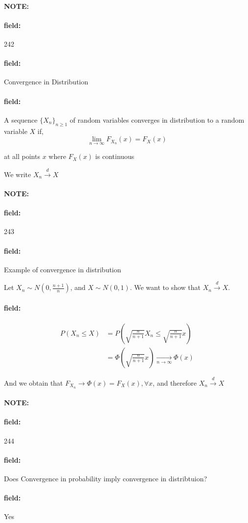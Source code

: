 \documentclass[12pt]{article}
\newenvironment{note}{\paragraph{NOTE:}}{}
\newenvironment{field}{\paragraph{field:}}{}
\begin{document}
\begin{note} \begin{field} \tiny 242 \end{field}
  \begin{field}
    Convergence in Distribution
  \end{field}
  \begin{field}
    A sequence $\{X_n\}_{n \geq 1}$ of random variables converges in distribution to a random variable $X$ if,
    $$ \lim_{n \to \infty} F_{X_n}(x) = F_X(x)$$

    at all points $x$ where $F_X(x)$ is continuous

    We write $X_n \overset{d}{\to} X$
  \end{field}
\end{note}

\begin{note} \begin{field} \tiny 243 \end{field}
  \begin{field}
    Example of convergence in distribution

    Let $X_n \sim N(0, \frac{n+1}{n})$, and $X \sim N(0,1)$. We want to show that $X_n \overset{d}{\to} X$.
  \end{field}
  \begin{field}
    \begin{align*}
      P(X_n \leq X) &= P(\sqrt{\frac{n}{n + 1}}X_n \leq \sqrt{\frac{n}{n+1}}x)\\
      &= \Phi(\sqrt{\frac{n}{n + 1}}x) \underset{n \to \infty}{\to} \Phi(x)
    \end{align*}

    And we obtain that $F_{X_n} \to \Phi(x) = F_X(x), \forall x$, and therefore $X_n \overset{d}{\to} X$
  \end{field}
\end{note}


\begin{note} \begin{field} \tiny 244 \end{field}
  \begin{field}
    Does Convergence in probability imply convergence in distribtuion?
  \end{field}
  \begin{field}
    Yes
  \end{field}
\end{note}
\end{document}
